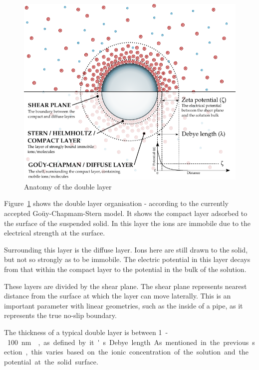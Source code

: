     \begin{figure}
      \begin{center}
        \includegraphics{content/introduction/graphics/doubleLayer_version2}
      \end{center}
      \caption{Anatomy of the double layer}
      \label{fig:doubleLayer_anatomy}
    \end{figure}

    Figure~\ref{fig:doubleLayer_anatomy} shows the double layer organisation - according to the currently accepted Goüy-Chapmam-Stern model.
    It shows the compact layer adsorbed to the surface of the suspended solid.
    In this layer the ions are immobile due to the electrical strength at the surface.
    
    Surrounding this layer is the diffuse layer.
    Ions here are still drawn to the solid, but not so strongly as to be immobile.
    The electric potential in this layer decays from that within the compact layer to the potential in the bulk of the solution.

    These layers are divided by the shear plane.
    The shear plane represents nearest distance from the surface at which the layer can move laterally.
    This is an important parameter with linear geometries, such as the inside of a pipe, as it represents the true no-slip boundary.

    The thickness of a typical double layer is between \SI{1}-\SI{100}{\nano\meter}~\cite{Jiang2010}, as defined by it's Debye length.
    As mentioned in the previous section, this varies based on the ionic concentration of the solution and the potential at the solid surface.


